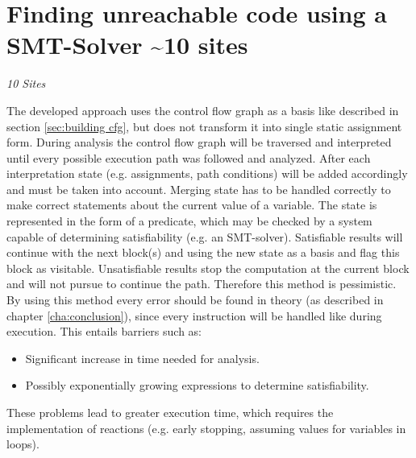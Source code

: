 
\chapter{Finding unreachable code using a SMT-Solver \textasciitilde 10 sites}
\label{cha:finding unreachable code using a smt-solver}
\emph{10 Sites}

The developed approach uses the control flow graph as a basis like described in section \ref{sec:building cfg}, but does not transform it into single static assignment form.
During analysis the control flow graph will be traversed and interpreted until every possible execution path was followed and analyzed.
After each interpretation state (e.g. assignments, path conditions) will be added accordingly and must be taken into account.
Merging state has to be handled correctly to make correct statements about the current value of a variable.
The state is represented in the form of a predicate, which may be checked by a system capable of determining satisfiability (e.g. an SMT-solver).
Satisfiable results will continue with the next block(s) and using the new state as a basis and flag this block as visitable.
Unsatisfiable results stop the computation at the current block and will not pursue to continue the path.
Therefore this method is pessimistic.
By using this method every error should be found in theory (as described in chapter \ref{cha:conclusion}), since every instruction will be handled like during execution. 
This entails barriers such as: 
\begin{itemize}
	\item Significant increase in time needed for analysis. 
	\item Possibly exponentially growing expressions to determine satisfiability.
\end{itemize}
These problems lead to greater execution time, which requires the implementation of reactions (e.g. early stopping, assuming values for variables in loops).

